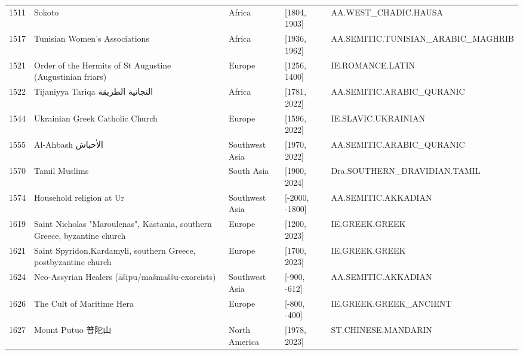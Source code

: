 {\begin{longtable}{rp{3.5cm}llp{3.5cm}}
1511 & {\raggedright Sokoto} & Africa & [1804, 1903] & {\raggedright AA.\allowbreak{}WEST\_\allowbreak{}CHADIC.\allowbreak{}HAUSA} \\
1517 & {\raggedright Tunisian Women's Associations} & Africa & [1936, 1962] & {\raggedright AA.\allowbreak{}SEMITIC.\allowbreak{}TUNISIAN\_\allowbreak{}ARABIC\_\allowbreak{}MAGHRIB} \\
1521 & {\raggedright Order of the Hermits of St Augustine (Augustinian friars)} & Europe & [1256, 1400] & {\raggedright IE.\allowbreak{}ROMANCE.\allowbreak{}LATIN} \\
1522 & {\raggedright Tijaniyya Tariqa {\arabicfont التجانية الطريقة}} & Africa & [1781, 2022] & {\raggedright AA.\allowbreak{}SEMITIC.\allowbreak{}ARABIC\_\allowbreak{}QURANIC} \\
1544 & {\raggedright Ukrainian Greek Catholic Church} & Europe & [1596, 2022] & {\raggedright IE.\allowbreak{}SLAVIC.\allowbreak{}UKRAINIAN} \\
1555 & {\raggedright Al-Ahbash {\arabicfont الأحباش}} & Southwest Asia & [1970, 2022] & {\raggedright AA.\allowbreak{}SEMITIC.\allowbreak{}ARABIC\_\allowbreak{}QURANIC} \\
1570 & {\raggedright Tamil Muslims} & South Asia & [1900, 2024] & {\raggedright Dra.\allowbreak{}SOUTHERN\_\allowbreak{}DRAVIDIAN.\allowbreak{}TAMIL} \\
1574 & {\raggedright Household religion at Ur} & Southwest Asia & [-2000, -1800] & {\raggedright AA.\allowbreak{}SEMITIC.\allowbreak{}AKKADIAN} \\
1619 & {\raggedright Saint Nicholas "Maroulenas", Kastania, southern Greece, byzantine church} & Europe & [1200, 2023] & {\raggedright IE.\allowbreak{}GREEK.\allowbreak{}GREEK} \\
1621 & {\raggedright Saint Spyridon,Kardamyli, southern Greece, postbyzantine church} & Europe & [1700, 2023] & {\raggedright IE.\allowbreak{}GREEK.\allowbreak{}GREEK} \\
1624 & {\raggedright Neo-Assyrian Healers (āšipu/mašmaššu-exorcists)} & Southwest Asia & [-900, -612] & {\raggedright AA.\allowbreak{}SEMITIC.\allowbreak{}AKKADIAN} \\
1626 & {\raggedright The Cult of Maritime Hera} & Europe & [-800, -400] & {\raggedright IE.\allowbreak{}GREEK.\allowbreak{}GREEK\_\allowbreak{}ANCIENT} \\
1627 & {\raggedright Mount Putuo 普陀山} & North America & [1978, 2023] & {\raggedright ST.\allowbreak{}CHINESE.\allowbreak{}MANDARIN} \\

\end{longtable}}
